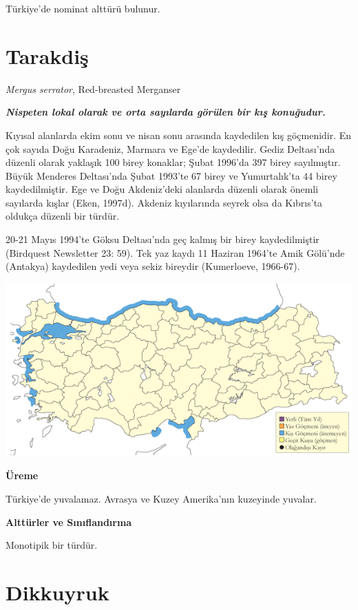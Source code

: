 \documentclass[
  a4paper,
  DIV=11,
  numbers=noendperiod]{scrreprt}
\begin{document}
Türkiye'de nominat alttürü bulunur.

\section{Tarakdiş}\label{tarakdiux15f}

\emph{Mergus serrator}, Red-breasted Merganser

\textbf{\emph{Nispeten lokal olarak ve orta sayılarda görülen bir kış
konuğudur.}}

Kıyısal alanlarda ekim sonu ve nisan sonu arasında kaydedilen kış
göçmenidir. En çok sayıda Doğu Karadeniz, Marmara ve Ege'de kaydedilir.
Gediz Deltası'nda düzenli olarak yaklaşık 100 birey konaklar; Şubat
1996'da 397 birey sayılmıştır. Büyük Menderes Deltası'nda Şubat 1993'te
67 birey ve Yumurtalık'ta 44 birey kaydedilmiştir. Ege ve Doğu
Akdeniz'deki alanlarda düzenli olarak önemli sayılarda kışlar (Eken,
1997d). Akdeniz kıyılarında seyrek olsa da Kıbrıs'ta oldukça düzenli bir
türdür.

20-21 Mayıs 1994'te Göksu Deltası'nda geç kalmış bir birey
kaydedilmiştir (Birdquest Newsletter 23: 59). Tek yaz kaydı 11 Haziran
1964'te Amik Gölü'nde (Antakya) kaydedilen yedi veya sekiz bireydir
(Kumerloeve, 1966-67).

\includegraphics{images/harita_Page_034.png}

\textbf{Üreme}

Türkiye'de yuvalamaz. Avrasya ve Kuzey Amerika'nın kuzeyinde yuvalar.

\textbf{Alttürler ve Sınıflandırma}

Monotipik bir türdür.

\section{Dikkuyruk}\label{dikkuyruk}
\end{document}
